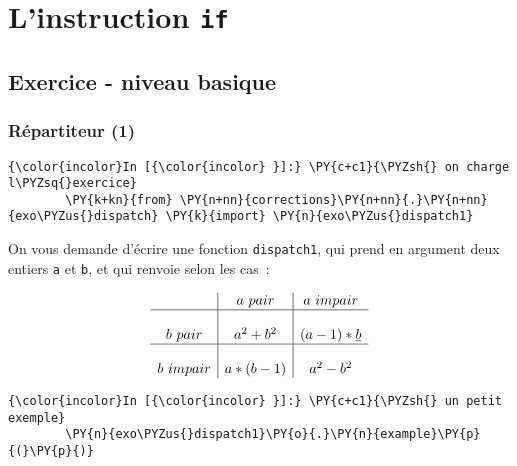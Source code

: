     \hypertarget{linstruction-if}{%
\section{\texorpdfstring{L'instruction
\texttt{if}}{L'instruction if}}\label{linstruction-if}}

    \hypertarget{exercice---niveau-basique}{%
\subsection{Exercice - niveau basique}\label{exercice---niveau-basique}}

    \hypertarget{ruxe9partiteur-1}{%
\subsubsection{Répartiteur (1)}\label{ruxe9partiteur-1}}

    \begin{Verbatim}[commandchars=\\\{\}]
{\color{incolor}In [{\color{incolor} }]:} \PY{c+c1}{\PYZsh{} on charge l\PYZsq{}exercice}
        \PY{k+kn}{from} \PY{n+nn}{corrections}\PY{n+nn}{.}\PY{n+nn}{exo\PYZus{}dispatch} \PY{k}{import} \PY{n}{exo\PYZus{}dispatch1}
\end{Verbatim}


    On vous demande d'écrire une fonction \texttt{dispatch1}, qui prend en
argument deux entiers \texttt{a} et \texttt{b}, et qui renvoie selon les
cas~:

\[\begin{array}{c|c|c} & a~ pair & a~ impair\\
\hline
& & \\
b~ pair & a\textsuperscript{2}+b\textsuperscript{2} & (a-1) * \emph{b}\\
\hline
& & \\
b~impair & a * (b-1) & a\textsuperscript{2}-b\textsuperscript{2}
\end{array}
\]


    \begin{Verbatim}[commandchars=\\\{\}]
{\color{incolor}In [{\color{incolor} }]:} \PY{c+c1}{\PYZsh{} un petit exemple}
        \PY{n}{exo\PYZus{}dispatch1}\PY{o}{.}\PY{n}{example}\PY{p}{(}\PY{p}{)}
\end{Verbatim}


